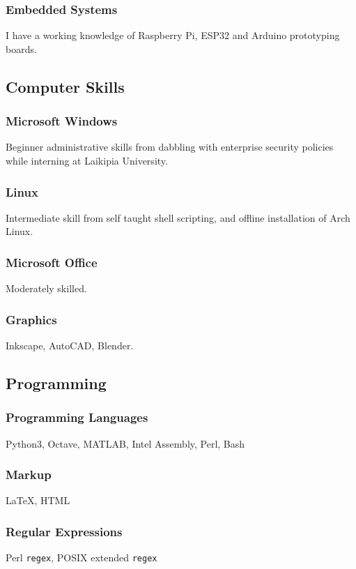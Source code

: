 \documentclass[a4paper,10pt]{article}
\begin{document}
\subsubsection{Embedded Systems}
I have a working knowledge of Raspberry Pi, ESP32 and Arduino prototyping boards.

\subsection{Computer Skills}
\subsubsection{Microsoft Windows}
Beginner administrative skills from dabbling with enterprise security policies while interning at Laikipia University.
\subsubsection{Linux}
Intermediate skill from self taught shell scripting, and offline installation of Arch Linux.
\subsubsection{Microsoft Office}
Moderately skilled.
\subsubsection{Graphics}
Inkscape, AutoCAD, Blender.

\subsection{Programming}
\subsubsection{Programming Languages}
Python3, Octave, MATLAB, Intel Assembly, Perl, Bash
\subsubsection{Markup}
\LaTeX, HTML
\subsubsection{Regular Expressions}
Perl \texttt{regex}, POSIX extended \texttt{regex}
\end{document}
